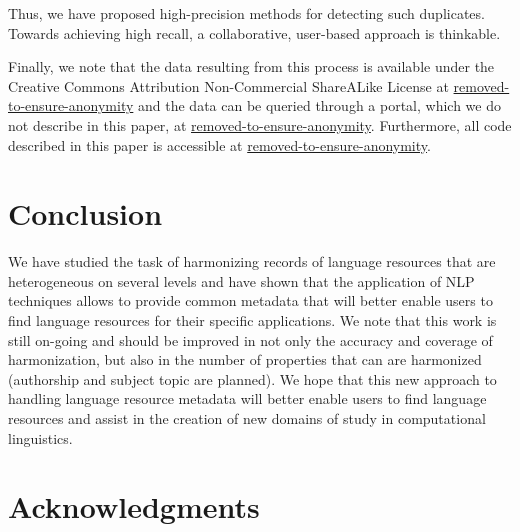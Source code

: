 \documentclass[11pt]{article}
\begin{document}
Thus, we have proposed high-precision methods for detecting such duplicates. Towards achieving high recall, a collaborative, user-based approach is thinkable.


Finally, we note that the data resulting from this process is available
under the Creative Commons Attribution Non-Commercial ShareALike License at
\url{removed-to-ensure-anonymity} and the data can be queried through a portal, which we do not
describe in this paper, at \url{removed-to-ensure-anonymity}. Furthermore, all
code described in this paper is accessible at \url{removed-to-ensure-anonymity}.

\section{Conclusion}

We have studied the task of harmonizing records of language resources that are
heterogeneous on several levels and have shown that the application of NLP
techniques allows to provide common metadata that will better enable users to
find language resources for their specific applications. We note that this work
is still on-going and should be improved in not only the accuracy and coverage
of harmonization, but also in the number of properties that can are harmonized
(authorship and subject topic are planned). We hope that this new
approach to handling language resource metadata will better enable users to find
language resources and assist in the creation of new domains of study in
computational linguistics.

\section*{Acknowledgments}

%



\end{document}

